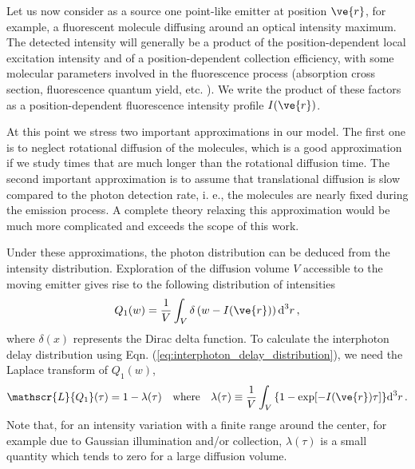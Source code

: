 Let us now consider as a source one point-like emitter at position $\ve{r}$, for example, a fluorescent molecule
diffusing around an optical intensity maximum. 
The detected intensity will generally be a product of the position-dependent local 
excitation intensity and of a position-dependent collection efficiency, with some 
molecular parameters involved in the fluorescence process (absorption cross section, 
fluorescence quantum yield, etc. ). We write the product of these factors as a 
position-dependent fluorescence intensity profile $I(\ve{r})$. 

At this point we stress two important approximations in our model. The first one is 
to neglect rotational diffusion of the molecules, which is a good approximation 
if we study times that are much longer than the rotational diffusion time. The 
second important approximation is to assume that translational diffusion is slow
 compared to the photon detection rate, i. e., the molecules are nearly fixed 
during the emission process. A complete theory relaxing this approximation would 
be much more complicated and exceeds the scope of this work.

Under these approximations, the photon distribution can be deduced from the 
intensity distribution. Exploration of the diffusion volume $V$ accessible to the moving emitter gives rise to the following distribution of intensities 
\begin{equation}
Q_1(w)=\frac{1}{V}\int_V{\delta\left( w-I(\ve{r})\right)\mbox{d}^3r} \,,
\label{eq:intesity1}
\end{equation} 
where $\delta(x)$ represents the Dirac delta function. To calculate the interphoton delay 
distribution using Eqn. (\ref{eq:interphoton_delay_distribution}), we need the Laplace transform of $Q_1(w)$, 
\begin{equation}
\mathscr{L}\{Q_1\}(\tau) = 1 -\lambda(\tau) \quad \mbox{where} \quad 
\lambda(\tau)\equiv \frac{1}{V}\int_V{ \{1-\exp[-I(\ve{r})\tau]\}\mbox{d}^3r} \, .
\label{eq:lambda}
\end{equation} 
Note that, for an intensity variation with a finite range around the center, 
for example due to Gaussian illumination and/or collection, $\lambda(\tau)$ is a 
small quantity which tends to zero for a large diffusion volume.  

